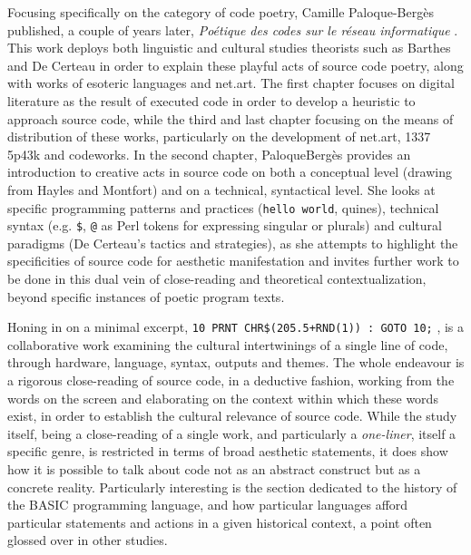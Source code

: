Focusing specifically on the category of code poetry, Camille Paloque-Bergès published, a couple of years later, \emph{Poétique des codes sur le réseau informatique} \citep{paloque-berges_poetique_2009}. This work deploys both linguistic and cultural studies theorists such as Barthes and De Certeau in order to explain these playful acts of source code poetry, along with works of esoteric languages and net.art. The first chapter focuses on digital literature as the result of executed code in order to develop a heuristic to approach source code, while the third and last chapter focusing on the means of distribution of these works, particularly on the development of net.art, 1337 5p43k and codeworks. In the second chapter, PaloqueBergès provides an introduction to creative acts in source code on both a conceptual level (drawing from Hayles and Montfort) and on a technical, syntactical level. She looks at specific programming patterns and practices (\lstinline{hello world}, quines), technical syntax (e.g. \lstinline{$}, \lstinline{@} as Perl tokens for expressing singular or plurals) and cultural paradigms (De Certeau's tactics and strategies), as she attempts to highlight the specificities of source code for aesthetic manifestation and invites further work to be done in this dual vein of close-reading and theoretical contextualization, beyond specific instances of poetic program texts.

Honing in on a minimal excerpt, \lstinline{10 PRNT CHR$(205.5+RND(1)) : GOTO 10;} \citep{montfort_10_2014}, is a collaborative work examining the cultural intertwinings of a single line of code, through hardware, language, syntax, outputs and themes. The whole endeavour is a rigorous close-reading of source code, in a deductive fashion, working from the words on the screen and elaborating on the context within which these words exist, in order to establish the cultural relevance of source code. While the study itself, being a close-reading of a single work, and particularly a \emph{one-liner}, itself a specific genre, is restricted in terms of broad aesthetic statements, it does show how it is possible to talk about code not as an abstract construct but as a concrete reality. Particularly interesting is the section dedicated to the history of the BASIC programming language, and how particular languages afford particular statements and actions in a given historical context, a point often glossed over in other studies.


